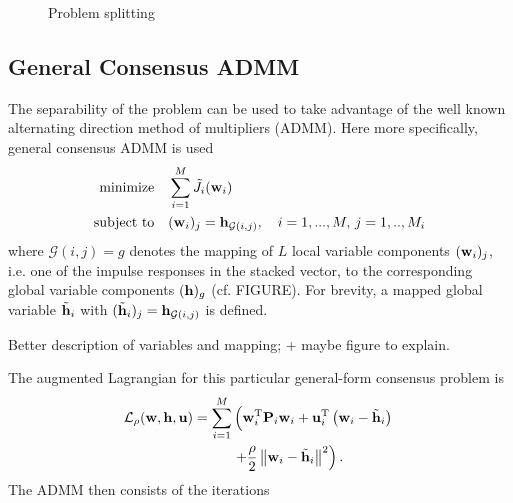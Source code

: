 \documentclass{article}
\newcommand{\h}{\mtxb{h}}
\newcommand{\w}{\mtxb{w}}
\newcommand{\uu}{\mtxb{u}}
\newcommand{\aRho}{\mtxb{P}}
\begin{document}
\begin{figure}
    \centering
    
    \caption{Problem splitting}
    \label{fig:problem_splitting:problem_splitting_matrix}
\end{figure}

\subsection{General Consensus ADMM}
\label{ssec:general_consensus_admm}
The separability of the problem can be used to take advantage of the well known alternating direction method of multipliers (ADMM).
Here more specifically, general consensus ADMM \cite{} is used 
\begin{align}
    \operatorname{minimize} \quad &\sum_{i=1}^{M} \tilde{J}_i(\w_i)\\
    \text{subject to} \quad &(\w_i)_j = \h_{\mathcal{G}(i,j)},\quad i=1,...,M,\,j=1,..,M_i
\end{align}
where \(\mathcal{G}(i,j)=g\) denotes the mapping of \(L\) local variable components \((\w_i)_j\), i.e. one of the impulse responses in the stacked vector, to the corresponding global variable components \((\h)_g\) (cf. FIGURE). For brevity, a mapped global variable \(\tilde{\h}_i\) with \((\tilde{\h}_i)_j = \h_{\mathcal{G}(i,j)}\) is defined.
\begin{note}
    Better description of variables and mapping; + maybe figure to explain.
\end{note}
The augmented Lagrangian for this particular general-form consensus problem is
\begin{align}
    \mathcal{L}_{\rho} (\w,\h,\uu) = \sum_{i=1}^M &\left( \w_i^\T \aRho_i \w_i + \uu_i^{\T} \left(\w_i - \tilde{\h}_i\right) \vphantom{+ \frac{\rho}{2} \left\| \w_i - \tilde{\h}_i \right\|^2} \right.\nonumber\\
    &\left.+ \frac{\rho}{2} \left\| \w_i - \tilde{\h}_i \right\|^2 \right).\label{eq:general_consensus_admm:lagrangian}
\end{align}
The ADMM then consists of the iterations
\end{document}
